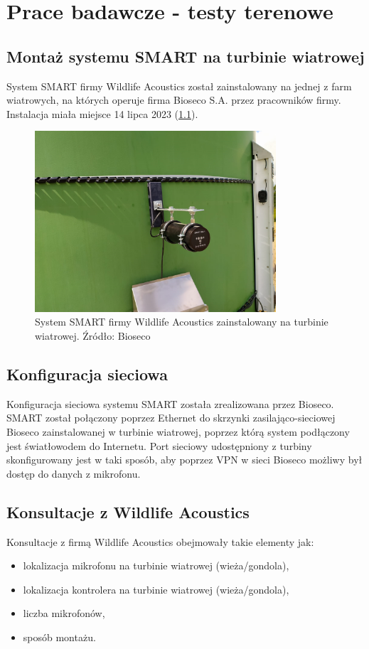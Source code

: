 \documentclass{sprz}
\begin{document}
\chapter{Prace badawcze - testy terenowe}

\section{Montaż systemu SMART na turbinie wiatrowej}
System SMART firmy Wildlife Acoustics został zainstalowany na jednej z farm wiatrowych, na których operuje firma Bioseco S.A. przez pracowników firmy. Instalacja miała miejsce 14 lipca 2023 (\ref{img:smart-installed}). 

\begin{figure}[h]
  \centering
  \includegraphics[width=0.8\textwidth]{sprz/smart-installed.png}
  \caption{System SMART firmy Wildlife Acoustics zainstalowany na turbinie wiatrowej. Źródło: Bioseco}
  \label{img:smart-installed}
\end{figure} 

\section{Konfiguracja sieciowa}
Konfiguracja sieciowa systemu SMART została zrealizowana przez Bioseco. SMART został połączony poprzez Ethernet do skrzynki zasilająco-sieciowej Bioseco zainstalowanej w turbinie wiatrowej, poprzez którą system podłączony jest światłowodem do Internetu. Port sieciowy udostępniony z turbiny skonfigurowany jest w taki sposób, aby poprzez VPN w sieci Bioseco możliwy był dostęp do danych z mikrofonu.

\section{Konsultacje z Wildlife Acoustics}
Konsultacje z firmą Wildlife Acoustics obejmowały takie elementy jak:
\begin{itemize}
  \item{lokalizacja mikrofonu na turbinie wiatrowej (wieża/gondola),}
  \item{lokalizacja kontrolera na turbinie wiatrowej (wieża/gondola),}
  \item{liczba mikrofonów,}
  \item{sposób montażu.}
\end{itemize}
\end{document}
